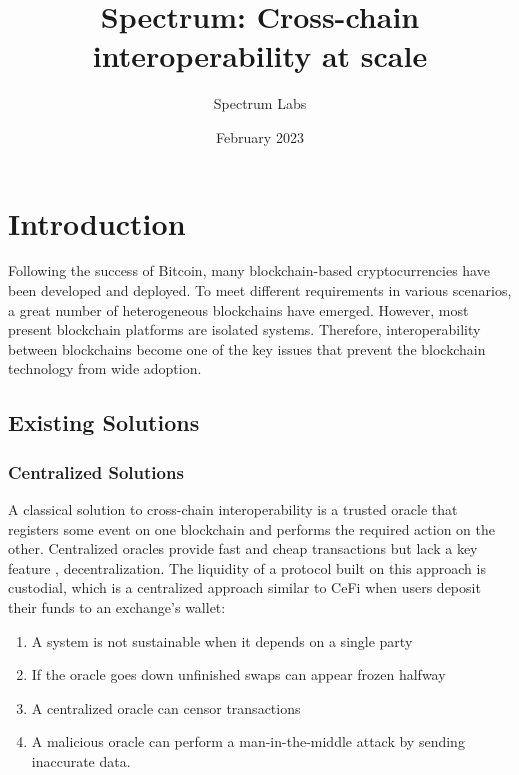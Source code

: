 \documentclass{article}
\title{Spectrum: Cross-chain interoperability at scale}
\author{Spectrum Labs}
\date{February 2023}
\begin{document}
    \pagecolor{SpectrumLavander}

    \maketitle


    \section{Introduction}\label{sec:introduction}

    Following the success of Bitcoin, many blockchain-based cryptocurrencies have been developed and deployed.
    To meet different requirements in various scenarios, a great number of heterogeneous blockchains have emerged.
    However, most present blockchain platforms are isolated systems.
    Therefore, interoperability between blockchains become one of the key issues
    that prevent the blockchain technology from wide adoption.

    \subsection{Existing Solutions}\label{subsec:existing-solutions}

    \subsubsection{Centralized Solutions}\label{subsubsec:centralized-solutions}

    A classical solution to cross-chain interoperability is a trusted oracle that registers some event on one blockchain and performs the required action on the other.
    Centralized oracles provide fast and cheap transactions but lack a key feature , decentralization.
    The liquidity of a protocol built on this approach is custodial, which is a centralized approach similar to CeFi when users deposit their funds to an exchange’s wallet:
    \begin{enumerate}
        \item A system is not sustainable when it depends on a single party
        \item If the oracle goes down unfinished swaps can appear frozen halfway
        \item A centralized oracle can censor transactions
        \item A malicious oracle can perform a man-in-the-middle attack by sending inaccurate data.
    \end{enumerate}
\end{document}
